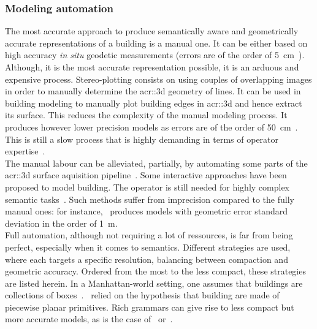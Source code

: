         \subsubsection{Modeling automation}
            The most accurate approach to produce semantically aware and geometrically accurate representations of a building is a manual one.
            It can be either based on high accuracy \textit{in situ} geodetic measurements (errors are of the order of \SI{5}{\cm}~\parencite{kaartinen2005accuracy}).
            Although, it is the most accurate representation possible, it is an arduous and expensive process.
            Stereo-plotting consists on using couples of overlapping images in order to manually determine the \gls{acr::3d} geometry of lines.
            It can be used in building modeling to manually plot building edges in \gls{acr::3d} and hence extract its surface.
            This reduces the complexity of the manual modeling process.
            It produces however lower precision models as errors are of the order of \SI{50}{\cm}~\parencite{jamet1995building}.
            This is still a slow process that is highly demanding in terms of operator expertise~\parencite{ruther2002application}.\\
            The manual labour can be alleviated, partially, by automating some parts of the \gls{acr::3d} surface aquisition pipeline~\parencite{musialski2013survey}.
            Some interactive approaches have been proposed to model building.
            The operator is still needed for highly complex semantic tasks~\parencite{mayunga2005semi, castellazzi2015laser}.
            Such methods suffer from imprecision compared to the fully manual ones: for instance,~\textcite{mayunga2005semi} produces models with geometric error standard deviation in the order of \SI{1}{\m}.\\
            Full automation, although not requiring a lot of ressources, is far from being perfect, especially when it comes to semantics.
            Different strategies are used, where each targets a specific resolution, balancing between compaction and geometric accuracy.
            Ordered from the most to the less compact, these strategies are listed herein.
            In a Manhattan-world setting, one assumes that buildings are collections of boxes~\parencite{vanegas2010building, li2016manhattan}.~\textcite{lafarge_ijcv12, nan2017polyfit}
            relied on the hypothesis that building are made of piecewise planar primitives.
            Rich grammars can give rise to less compact but more accurate models, as is the case of~\textcite{demir2015procedural} or~\textcite{zeng2018neural}.
